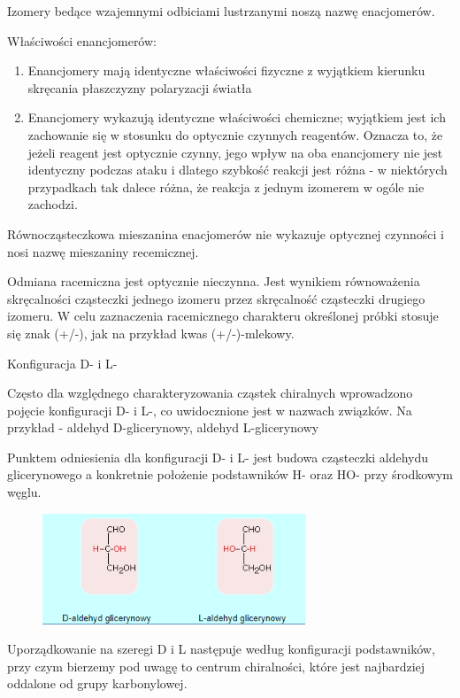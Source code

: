 Izomery bedące wzajemnymi odbiciami lustrzanymi noszą nazwę enacjomerów.

\newpage
Właściwości enancjomerów:
\begin{enumerate}
    \item Enancjomery mają identyczne właściwości fizyczne z wyjątkiem kierunku skręcania płaszczyzny polaryzacji światła
    \item Enancjomery wykazują identyczne właściwości chemiczne; wyjątkiem jest ich zachowanie się w stosunku do optycznie czynnych reagentów. Oznacza to, że jeżeli reagent jest optycznie czynny, jego wpływ na oba enancjomery nie jest identyczny podczas ataku i dlatego szybkość reakcji jest różna - w niektórych przypadkach tak dalece różna, że reakcja z jednym izomerem w ogóle nie zachodzi.
\end{enumerate}

Równocząsteczkowa mieszanina enacjomerów nie wykazuje optycznej czynności i nosi nazwę mieszaniny recemicznej.

Odmiana racemiczna jest optycznie nieczynna. Jest wynikiem równoważenia skręcalności cząsteczki jednego izomeru przez skręcalność cząsteczki drugiego izomeru.
W celu zaznaczenia racemicznego charakteru określonej próbki stosuje się znak (+/-), jak na przykład kwas (+/-)-mlekowy.
\newline

Konfiguracja D- i L-
\newline

Często dla względnego charakteryzowania cząstek chiralnych wprowadzono pojęcie konfiguracji D- i L-, co uwidocznione jest w nazwach związków. Na przykład - aldehyd D-glicerynowy, aldehyd L-glicerynowy

Punktem odniesienia dla konfiguracji D- i L- jest budowa cząsteczki aldehydu glicerynowego a konkretnie położenie podstawników H- oraz HO- przy środkowym węglu.

\begin{figure}[H]
    \centering
    \includegraphics[width=0.7\textwidth]{img/D_L}
    \label{fig.D_L}
\end{figure}

Uporządkowanie na szeregi D i L następuje według konfiguracji podstawników, przy czym bierzemy pod uwagę to centrum chiralności, które jest najbardziej oddalone od grupy karbonylowej.